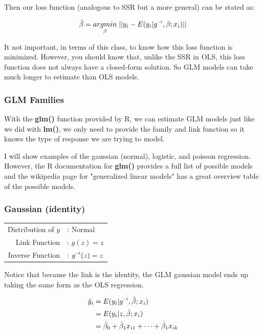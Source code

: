\documentclass[10pt]{article}\usepackage[]{graphicx}\usepackage[]{color}
\newcommand\inv[1]{#1\raisebox{1.15ex}{$\scriptscriptstyle-\!1$}}
\begin{document}
Then our loss function (analogous to SSR but a more general) can be stated as:

\begin{align}
   \hat{\beta} = \underset{\beta}{argmin} \; ||y_i - E(y_i|\inv{g},\beta;x_i)||
\end{align}

It not important, in terms of this class, to know how this loss function is minimized. However, you should know that, unlike the SSR in OLS, this loss function does not always have a closed-form solution. So GLM models can take much longer to estimate than OLS models.

\subsubsection*{GLM Families}

With the {\bf glm()} function provided by R, we can estimate GLM models just like we did with {\bf lm()}, we only need to provide the family and link function so it knows the type of response we are trying to model. 

I will show examples of the gaussian (normal), logistic, and poisson regression. However, the R documentation for {\bf glm()} provides a full list of possible models and the wikipedia page for "generalized linear models" has a great overview table of the possible models.

\subsubsection*{Gaussian (identity)}

\begin{tabularx}{\textwidth}{r@{}l@{}}
  { Distribution of $y$ } &: Normal \\
  { Link Function } &: $g(z)=z$ \\
  { Inverse Function } &: $\inv{g}(z)=z$ \\
\end{tabularx}

\vspace{2ex}
\hspace*{\fill}%

Notice that because the link is the identity, the GLM gaussian model ends up taking the same form as the OLS regression.

\begin{align}
  \hat{y}_i &= E(y_i|\inv{g},\hat{\beta};x_i) \\
  &= E(y_i|z,\hat{\beta};x_i) \\
  &= \hat{\beta}_0 + \hat{\beta}_1 x_{i1} + \cdots + \hat{\beta}_1 x_{ik}
\end{align}
\end{document}
